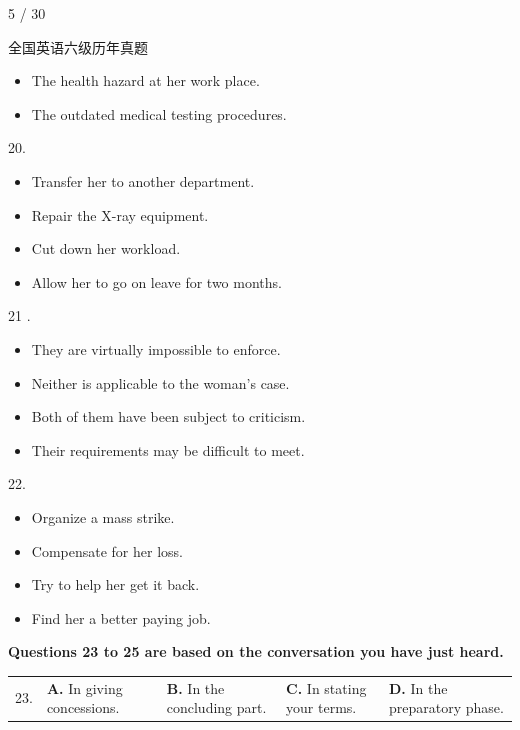 \documentclass[UTF8,11pt]{ctexart}
\begin{document}
5 / 30


全国英语六级历年真题


\begin{itemize}[leftmargin=2em,itemsep=.2em,topsep=.4em]\item[B.] The health hazard at her work place.
\item[D.] The outdated medical testing procedures.
\end{itemize}

20.


\begin{itemize}[leftmargin=2em,itemsep=.2em,topsep=.4em]\item[A.] Transfer her to another department.
\item[B.] Repair the X-ray equipment.
\item[C.] Cut down her workload.
\item[D.] Allow her to go on leave for two months.
\end{itemize}

21 .


\begin{itemize}[leftmargin=2em,itemsep=.2em,topsep=.4em]\item[A.] They are virtually impossible to enforce.
\item[B.] Neither is applicable to the woman's case.
\item[C.] Both of them have been subject to criticism.
\item[D.] Their requirements may be difficult to meet.
\end{itemize}

22.


\begin{itemize}[leftmargin=2em,itemsep=.2em,topsep=.4em]\item[A.] Organize a mass strike.
\item[B.] Compensate for her loss.
\item[C.] Try to help her get it back.
\item[D.] Find her a better paying job.
\end{itemize}

\textbf{Questions 23 to 25 are based on the conversation you have just heard.}


\noindent\begin{tabularx}{\linewidth}{@{}lXXXX@{}}23. & \textbf{A.} In giving concessions. & \textbf{B.} In the concluding part. & \textbf{C.} In stating your terms. & \textbf{D.} In the preparatory phase.\\\end{tabularx}\par
\end{document}
